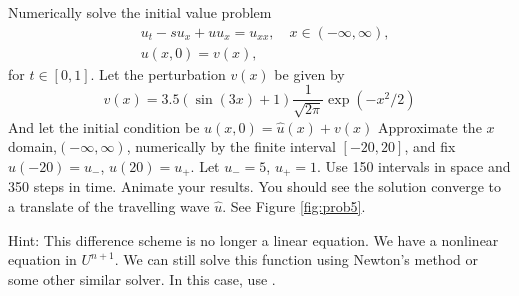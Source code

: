 \begin{problem}
\label{prob:prob5}
Numerically solve the initial value problem
\begin{align*}
	&{ } u_t -su_x + uu_x = u_{xx}, \quad x \in (-\infty,\infty),\\
	&{ } u(x,0) = v(x),
\end{align*}
for $t \in [0,1]$.
Let the perturbation $v(x)$ be given by
\[v(x) = 3.5(\sin{(3x)} + 1)\frac{1}{\sqrt{2\pi}} \exp{(-x^2/2)}\]
And let the initial condition be $u(x, 0) = \hat{u}(x) + v(x)$
Approximate the $x$ domain,$(-\infty, \infty)$, numerically by the finite interval $[-20,20]$, and fix $u(-20) = u_-$, $u(20) = u_+$. Let $u_- = 5$, $u_+ = 1$.
Use 150 intervals in space and 350 steps in time.
Animate your results.
You should see the solution converge to a translate of the travelling wave $\hat{u}$.
See Figure \ref{fig:prob5}.

Hint: This difference scheme is no longer a linear equation.
We have a nonlinear equation in $U^{n+1}$.
We can still solve this function using Newton's method or some other similar solver.
In this case, use .


\end{problem}

